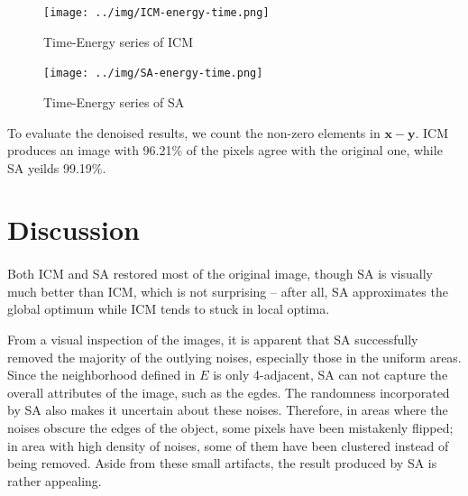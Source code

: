 \documentclass{article}
\begin{document}
\begin{figure}[H]
\centering
\texttt{[image: ../img/ICM-energy-time.png]}
\caption{Time-Energy series of ICM}
\end{figure}

\begin{figure}[H]
\centering
\texttt{[image: ../img/SA-energy-time.png]}
\caption{Time-Energy series of SA}
\end{figure}
To evaluate the denoised results, we count the non-zero elements in $\mathbf{x} - \mathbf{y}$. ICM produces an image with  96.21\% of the pixels agree with the original one, while SA yeilds 99.19\%.

\section{Discussion}
\paragraph{}
Both ICM and SA restored most of the original image, though SA is visually much better than ICM, which is not surprising -- after all, SA approximates the global optimum while ICM tends to stuck in local optima.

From a visual inspection of the images, it is apparent that SA successfully removed the majority of the outlying noises, especially those in the uniform areas. Since the neighborhood defined in $E$ is only 4-adjacent, SA can not capture the overall attributes of the image, such as the egdes. The randomness incorporated by SA also makes it uncertain about these noises. Therefore, in areas where the noises obscure the edges of the object, some pixels have been mistakenly flipped; in area with high density of noises, some of them have been clustered instead of being removed. Aside from these small artifacts, the result produced by SA is rather appealing.


\end{document}
